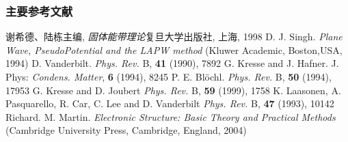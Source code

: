 \documentclass[cjk,slidestop,compress,mathserif,blue]{beamer}
\begin{document}
\begin{thebibliography}{99}
\frame
{
\frametitle{主要参考文献}
{\small
	谢希德、陆栋\:主编, {\textit{固体能带理论}}\:复旦大学出版社, 上海, 1998
        \textrm{D. J. Singh. \textit{Plane Wave, PseudoPotential and the LAPW method} (Kluwer Academic, Boston,USA, 1994)}
        \textrm{D. Vanderbilt. \textit{Phys. Rev.} B, \textbf{41} (1990), 7892} 
        \textrm{G. Kresse and J. Hafner. J. Phys: \textit{Condens. Matter}, \textbf{6} (1994), 8245}
        \textrm{P. E. Bl\"ochl. \textit{Phys. Rev.} B, \textbf{50} (1994), 17953}
        \textrm{G. Kresse and D. Joubert \textit{Phys. Rev.} B, \textbf{59} (1999), 1758}
        \textrm{K. Laasonen, A. Pasquarello, R. Car, C. Lee and D. Vanderbilt \textit{Phys. Rev.} B, \textbf{47} (1993), 10142}
	\textrm{Richard. M. Martin. \textit{Electronic Structure: Basic Theory and Practical Methods} (Cambridge University Press, Cambridge, England, 2004)}
}
\nocite*{}
}
\end{thebibliography}


\end{document}
